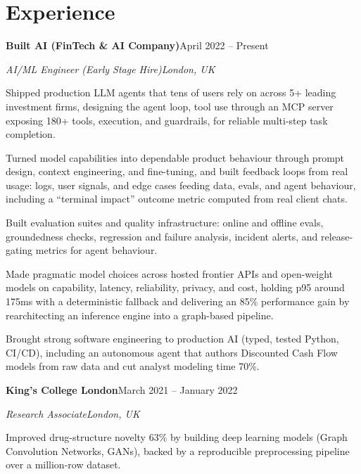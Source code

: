 \documentclass[10pt,a4paper]{article}
\newcommand{\entry}[4]{%
  {\color{company}\bfseries #1}\hfill {\color{muted}#2}\par
  \vspace{1pt}
  {\itshape #3}\hfill {\color{muted}\itshape #4}\par
  \vspace{3pt}%
}
\begin{document}
\section{Experience}
\entry{Built AI (FinTech \& AI Company)}{April 2022 -- Present}{AI/ML Engineer (Early Stage Hire)}{London, UK}
\begin{tight}
  \item Shipped production LLM agents that tens of users rely on across 5+ leading investment firms, designing the agent loop, tool use through an MCP server exposing 180+ tools, execution, and guardrails, for reliable multi-step task completion.
  \item Turned model capabilities into dependable product behaviour through prompt design, context engineering, and fine-tuning, and built feedback loops from real usage: logs, user signals, and edge cases feeding data, evals, and agent behaviour, including a ``terminal impact'' outcome metric computed from real client chats.
  \item Built evaluation suites and quality infrastructure: online and offline evals, groundedness checks, regression and failure analysis, incident alerts, and release-gating metrics for agent behaviour.
  \item Made pragmatic model choices across hosted frontier APIs and open-weight models on capability, latency, reliability, privacy, and cost, holding p95 around 175ms with a deterministic fallback and delivering an 85\% performance gain by rearchitecting an inference engine into a graph-based pipeline.
  \item Brought strong software engineering to production AI (typed, tested Python, CI/CD), including an autonomous agent that authors Discounted Cash Flow models from raw data and cut analyst modeling time 70\%.
\end{tight}

\entry{King's College London}{March 2021 -- January 2022}{Research Associate}{London, UK}
\begin{tight}
  \item Improved drug-structure novelty 63\% by building deep learning models (Graph Convolution Networks, GANs), backed by a reproducible preprocessing pipeline over a million-row dataset.
\end{tight}

\end{document}
